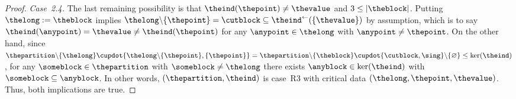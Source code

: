 \documentclass[10pt,a4paper]{amsart}
\numberwithin{equation}{section}
\newcommand{\subproof}[1]{\textit{#1}}
\newcommand{\spimgx}[2]{#1^{\leftarrow}(#2)}
\newcommand{\finerthan}{\mathrel{\leq}}
\newcommand{\scenariothree}{R3}
\begin{document}
{\begin{proof}
 \subproof{Case~2.4.} The last remaining possibility is that  $\theind(\thepoint)\neq \thevalue$ and $3\leq |\theblock|$. Putting $\thelong:=\theblock$ implies $\thelong\backslash \{\thepoint\}=\cutblock\subseteq \spimgx{\theind}{\{\thevalue\}}$ by assumption, which is to say $\theind(\anypoint)= \thevalue\neq \theind(\thepoint)$ for any $\anypoint\in\thelong$ with $\anypoint\neq \thepoint$. On the other hand, since $\thepartition\backslash\{\thelong\}\cupdot \{\thelong\backslash \{\thepoint\},\{\thepoint\}\} =\thepartition\backslash \{\theblock\}\cupdot \{\cutblock,\sing\}\backslash \{\varnothing\}\finerthan \ker(\theind)$, for any  $\someblock\in\thepartition$ with $\someblock\neq\thelong$ there exists $\anyblock\in \ker(\theind)$ with $\someblock\subseteq \anyblock$. In other words, $(\thepartition,\theind)$ is case~\scenariothree{} with critical data $(\thelong,\thepoint,\thevalue)$. Thus, both implications are true.
\end{proof}
}
\end{document}
